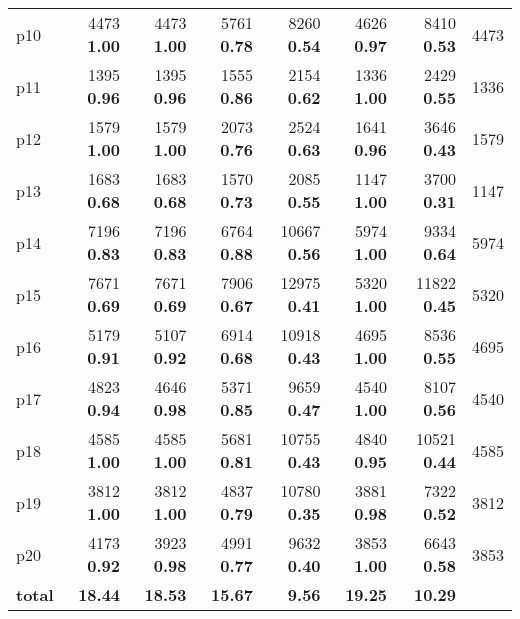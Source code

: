 \begin{tabular}{|l|rrrrrr|r|}
p10 & {\footnotesize 4473} \textbf{1.00} & {\footnotesize 4473} \textbf{1.00} & {\footnotesize 5761} \textbf{0.78} & {\footnotesize 8260} \textbf{0.54} & {\footnotesize 4626} \textbf{0.97} & {\footnotesize 8410} \textbf{0.53} & 4473\\
p11 & {\footnotesize 1395} \textbf{0.96} & {\footnotesize 1395} \textbf{0.96} & {\footnotesize 1555} \textbf{0.86} & {\footnotesize 2154} \textbf{0.62} & {\footnotesize 1336} \textbf{1.00} & {\footnotesize 2429} \textbf{0.55} & 1336\\
p12 & {\footnotesize 1579} \textbf{1.00} & {\footnotesize 1579} \textbf{1.00} & {\footnotesize 2073} \textbf{0.76} & {\footnotesize 2524} \textbf{0.63} & {\footnotesize 1641} \textbf{0.96} & {\footnotesize 3646} \textbf{0.43} & 1579\\
p13 & {\footnotesize 1683} \textbf{0.68} & {\footnotesize 1683} \textbf{0.68} & {\footnotesize 1570} \textbf{0.73} & {\footnotesize 2085} \textbf{0.55} & {\footnotesize 1147} \textbf{1.00} & {\footnotesize 3700} \textbf{0.31} & 1147\\
p14 & {\footnotesize 7196} \textbf{0.83} & {\footnotesize 7196} \textbf{0.83} & {\footnotesize 6764} \textbf{0.88} & {\footnotesize 10667} \textbf{0.56} & {\footnotesize 5974} \textbf{1.00} & {\footnotesize 9334} \textbf{0.64} & 5974\\
p15 & {\footnotesize 7671} \textbf{0.69} & {\footnotesize 7671} \textbf{0.69} & {\footnotesize 7906} \textbf{0.67} & {\footnotesize 12975} \textbf{0.41} & {\footnotesize 5320} \textbf{1.00} & {\footnotesize 11822} \textbf{0.45} & 5320\\
p16 & {\footnotesize 5179} \textbf{0.91} & {\footnotesize 5107} \textbf{0.92} & {\footnotesize 6914} \textbf{0.68} & {\footnotesize 10918} \textbf{0.43} & {\footnotesize 4695} \textbf{1.00} & {\footnotesize 8536} \textbf{0.55} & 4695\\
p17 & {\footnotesize 4823} \textbf{0.94} & {\footnotesize 4646} \textbf{0.98} & {\footnotesize 5371} \textbf{0.85} & {\footnotesize 9659} \textbf{0.47} & {\footnotesize 4540} \textbf{1.00} & {\footnotesize 8107} \textbf{0.56} & 4540\\
p18 & {\footnotesize 4585} \textbf{1.00} & {\footnotesize 4585} \textbf{1.00} & {\footnotesize 5681} \textbf{0.81} & {\footnotesize 10755} \textbf{0.43} & {\footnotesize 4840} \textbf{0.95} & {\footnotesize 10521} \textbf{0.44} & 4585\\
p19 & {\footnotesize 3812} \textbf{1.00} & {\footnotesize 3812} \textbf{1.00} & {\footnotesize 4837} \textbf{0.79} & {\footnotesize 10780} \textbf{0.35} & {\footnotesize 3881} \textbf{0.98} & {\footnotesize 7322} \textbf{0.52} & 3812\\
p20 & {\footnotesize 4173} \textbf{0.92} & {\footnotesize 3923} \textbf{0.98} & {\footnotesize 4991} \textbf{0.77} & {\footnotesize 9632} \textbf{0.40} & {\footnotesize 3853} \textbf{1.00} & {\footnotesize 6643} \textbf{0.58} & 3853\\
\hline
\textbf{total} & \textbf{18.44} & \textbf{18.53} & \textbf{15.67} & \textbf{9.56} & \textbf{19.25} & \textbf{10.29} & \\
\hline
\end{tabular}

